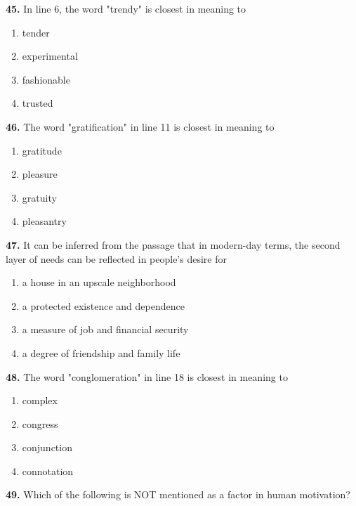 \documentclass[12pt]{article}
\begin{document}
\par
\vspace{0.25\baselineskip}
\noindent\textbf{45.} In line 6, the word "trendy" is closest in meaning to
\begin{enumerate}[label=(\Alph*),leftmargin=*,itemsep=0.2em]
\item tender
\item experimental
\item fashionable
\item trusted
\end{enumerate}
\par
\vspace{0.25\baselineskip}
\noindent\textbf{46.} The word "gratification" in line 11 is closest in meaning to
\begin{enumerate}[label=(\Alph*),leftmargin=*,itemsep=0.2em]
\item gratitude
\item pleasure
\item gratuity
\item pleasantry
\end{enumerate}
\par
\vspace{0.25\baselineskip}
\noindent\textbf{47.} It can be inferred from the passage that in modern-day terms, the second layer of needs can be reflected in people's desire for
\begin{enumerate}[label=(\Alph*),leftmargin=*,itemsep=0.2em]
\item a house in an upscale neighborhood
\item a protected existence and dependence
\item a measure of job and financial security
\item a degree of friendship and family life
\end{enumerate}
\par
\vspace{0.25\baselineskip}
\noindent\textbf{48.} The word "conglomeration" in line 18 is closest in meaning to
\begin{enumerate}[label=(\Alph*),leftmargin=*,itemsep=0.2em]
\item complex
\item congress
\item conjunction
\item connotation
\end{enumerate}
\par
\vspace{0.25\baselineskip}
\noindent\textbf{49.} Which of the following is NOT mentioned as a factor in human motivation?
\end{document}
